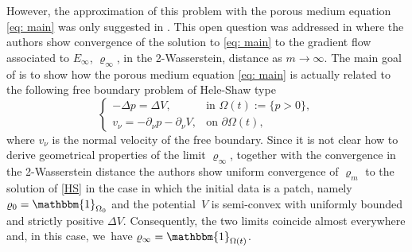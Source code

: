 \documentclass[JEP,XML,SOM,Unicode,published]{cedram}
\let\mathds\mathbbm
\theoremstyle{plain}
\theoremstyle{remark}
\begin{document}
However, the approximation of this problem with the porous medium equation \eqref{eq: main} was only suggested in \cite{MRSV2011, MRS2010}. This open question was addressed in \cite{AKY14} where the authors show convergence of the solution to \eqref{eq: main} to the gradient flow associated to $E_\infty$, $\varrho_\infty$, in the 2-Wasserstein, distance as $m\to\infty$. The main goal of \cite{AKY14} is to show how the porous medium equation \eqref{eq: main} is actually related to the following free boundary problem of Hele-Shaw type
\begin{equation}\label{HS}
\begin{cases}
-\Delta p = \Delta V, &\text{in } \Omega(t):=\{p>0\},\\
v_\nu= -\partial_\nu p -\partial_\nu V, &\text{on } \partial\Omega(t),
\end{cases}
\end{equation}
where $v_\nu$ is the normal velocity of the free boundary. Since it is not clear how to derive geometrical properties of the limit $\varrho_\infty$, together with the convergence in the 2-Wasserstein distance the authors show uniform convergence of $\varrho_m$ to the solution of \eqref{HS} in the case in which the initial data is a patch, namely $\varrho_0=\mathds{1}_{\Omega_0}$ and the potential~$V$ is semi-convex with uniformly bounded and strictly positive $\Delta V$. Consequently, the two limits coincide almost everywhere and, in this case, we~have $\varrho_\infty=\mathds{1}_{\Omega(t)}$.
\end{document}
